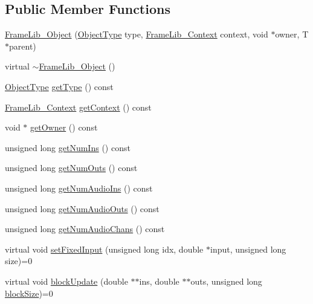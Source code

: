 \subsection*{Public Member Functions}
\begin{DoxyCompactItemize}
\item 
\hyperlink{class_frame_lib___object_a2a73dc92ffde31164b54f1b1f5889b77}{Frame\+Lib\+\_\+\+Object} (\hyperlink{_frame_lib___types_8h_a842c5e2e69277690b064bf363c017980}{Object\+Type} type, \hyperlink{class_frame_lib___context}{Frame\+Lib\+\_\+\+Context} context, void $\ast$owner, T $\ast$parent)
\item 
virtual \hyperlink{class_frame_lib___object_ab88bcc3fe9e1c9da41a4afebb3d05005}{$\sim$\+Frame\+Lib\+\_\+\+Object} ()
\item 
\hyperlink{_frame_lib___types_8h_a842c5e2e69277690b064bf363c017980}{Object\+Type} \hyperlink{class_frame_lib___object_a8d96d1f55054e583a99891ad65f84a3a}{get\+Type} () const
\item 
\hyperlink{class_frame_lib___context}{Frame\+Lib\+\_\+\+Context} \hyperlink{class_frame_lib___object_a8f636902888847c78cf16d74717bd861}{get\+Context} () const
\item 
void $\ast$ \hyperlink{class_frame_lib___object_ac1a0a288f1da02f9ac7199ac9f96acce}{get\+Owner} () const
\item 
unsigned long \hyperlink{class_frame_lib___object_a310416236585b52c2de1c47a9aa64b02}{get\+Num\+Ins} () const
\item 
unsigned long \hyperlink{class_frame_lib___object_a255f6ae814dbb946d445ef244dd39975}{get\+Num\+Outs} () const
\item 
unsigned long \hyperlink{class_frame_lib___object_ad29b6281916a933c5baa43cbb7d11efd}{get\+Num\+Audio\+Ins} () const
\item 
unsigned long \hyperlink{class_frame_lib___object_a430c0531a4c38ad49a556af1cca0af88}{get\+Num\+Audio\+Outs} () const
\item 
unsigned long \hyperlink{class_frame_lib___object_a59e6e7dba2d18444be6d5fbee15c73f2}{get\+Num\+Audio\+Chans} () const
\item 
virtual void \hyperlink{class_frame_lib___object_a0d3bed42a21ebf248366f4457722beff}{set\+Fixed\+Input} (unsigned long idx, double $\ast$input, unsigned long size)=0
\item 
virtual void \hyperlink{class_frame_lib___object_a6efd81ab386e62400960471fa3cc94e7}{block\+Update} (double $\ast$$\ast$ins, double $\ast$$\ast$outs, unsigned long \hyperlink{_frame_lib___memory_8cpp_a8ef7d53a4cac28bf580a61f265fcaaa6}{block\+Size})=0

\end{DoxyCompactItemize}
